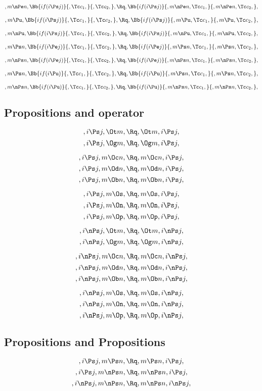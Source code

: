\[,m \nPe n, \Bb{if(i \Ps j)}{,\Tc c_1,}{,\Tc c_2,}, \Rq , \Bb{if(i \Ps j)}{,m \nPe n,\Tc c_1,}{,m \nPe n,\Tc c_2,},\]
\bigskip
\bigskip

\[,m \Pu, \Bb{if(i \Ps j)}{,\Tc c_1,}{,\Tc c_2,}, \Rq , \Bb{if(i \Ps j)}{,m \Pu,\Tc c_1,}{,m \Pu,\Tc c_2,},\]
\bigskip
\bigskip

\[,m \nPu, \Bb{if(i \Ps j)}{,\Tc c_1,}{,\Tc c_2,}, \Rq , \Bb{if(i \Ps j)}{,m \nPu,\Tc c_1,}{,m \nPu,\Tc c_2,},\]
\bigskip
\bigskip


\[,m \Ps n, \Bb{if(i \Pe j)}{,\Tc c_1,}{,\Tc c_2,}, \Rq , \Bb{if(i \Pe j)}{,m \Ps n,\Tc c_1,}{,m \Ps n,\Tc c_2,},\]
\bigskip
\bigskip

\[,m \nPs n, \Bb{if(i \Pe j)}{,\Tc c_1,}{,\Tc c_2,}, \Rq , \Bb{if(i \Pe j)}{,m \nPs n,\Tc c_1,}{,m \nPs n,\Tc c_2,},\]
\bigskip
\bigskip

\[,m \Ps n, \Bb{if(i \Pu)}{,\Tc c_1,}{,\Tc c_2,}, \Rq , \Bb{if(i \Pu)}{,m \Ps n,\Tc c_1,}{,m \Ps n,\Tc c_2,},\]
\bigskip
\bigskip

\[,m \nPs n, \Bb{if(i \Pu)}{,\Tc c_1,}{,\Tc c_2,}, \Rq , \Bb{if(i \Pu)}{,m \nPs n,\Tc c_1,}{,m \nPs n,\Tc c_2,},\]
\bigskip
\bigskip


\bigskip
\bigskip
\bigskip
\bigskip
\subsection{Propositions and operator}
\[, i \Ps j, \Ot m, \Rq , \Ot m, i \Ps j,\]
\[, i \Ps j, \Og m, \Rq , \Og m, i \Ps j,\]

\[, i \Ps j, m \Oc n, \Rq , m \Oc n, i \Ps j,\]
\[, i \Ps j, m \Od n, \Rq , m \Od n, i \Ps j,\]
\[, i \Ps j, m \Ob n, \Rq , m \Ob n, i \Ps j,\]

\[, i \Ps j, m \Os, \Rq , m \Os, i \Ps j,\]
\[, i \Ps j, m \On, \Rq , m \On, i \Ps j,\]
\[, i \Ps j, m \Op, \Rq , m \Op, i \Ps j,\]

\bigskip
\bigskip
\[, i \nPs j, \Ot m, \Rq , \Ot m, i \nPs j,\]
\[, i \nPs j, \Og m, \Rq , \Og m, i \nPs j,\]

\[, i \nPs j, m \Oc n, \Rq , m \Oc n, i \nPs j,\]
\[, i \nPs j, m \Od n, \Rq , m \Od n, i \nPs j,\]
\[, i \nPs j, m \Ob n, \Rq , m \Ob n, i \nPs j,\]

\[, i \nPs j, m \Os, \Rq , m \Os, i \nPs j,\]
\[, i \nPs j, m \On, \Rq , m \On, i \nPs j,\]
\[, i \nPs j, m \Op, \Rq , m \Op, i \nPs j,\]

\bigskip
\bigskip
\bigskip
\bigskip
\subsection{ Propositions and Propositions}
\[,i \Ps j, m \Ps n, \Rq , m \Ps n, i \Ps j,\]
\[,i \Ps j, m \nPs n, \Rq , m \nPs n, i \Ps j,\]
\[,i \nPs j, m \nPs n, \Rq , m \nPs n, i \nPs j,\]


